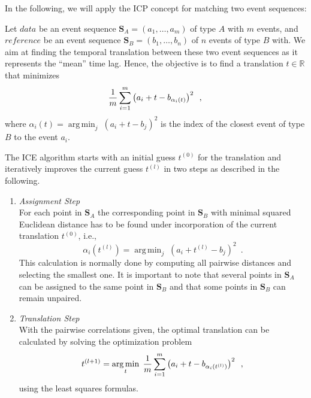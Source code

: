 \documentclass[conference]{IEEEtran}
\theoremstyle{examplestyle}
\DeclareMathOperator*{\argmin}{arg\,min}
\begin{document}
In the following, we will apply the \ac{ICP} concept for matching two event sequences:

Let \(data\) be an event sequence \(\pmb{S}_A = (a_1,\ldots, a_m)\) of type \(A\) with \(m\) events, and \(reference\) be an event sequence \(\pmb{S}_B=(b_1,\ldots, b_n)\) of \(n\) events of type \(B\) with. 
We aim at finding the temporal translation between these two event sequences as it represents the ``mean'' time lag.
Hence, the objective is to find a translation $t \in \mathbb{R}$ that minimizes 
\begin{equation}
 \dfrac{1}{m} \sum_{i = 1}^{m} \left( a_i + t - b_{\alpha_i(t)} \right)^2 \enspace , \\
\end{equation}
where $\alpha_i(t)= \argmin_j \; (a_i+t-b_j)^2$ is the index of the closest event of type $B$ to the event $a_i$.

The \ac{ICE} algorithm starts with an initial guess $t^{(0)}$ for the translation and iteratively improves the current guess $t^{(l)}$ in two steps as described in the following.

\begin{enumerate}
 \item \emph{Assignment Step}\\
For each point in \(\pmb{S}_A\) the corresponding point in \(\pmb{S}_B\) with minimal squared Euclidean distance has to be found under incorporation of the current translation $t^{(0)}$, i.e., 
\begin{equation}
\alpha_i(t^{(l)})= \argmin_j \; (a_i+t^{(l)}-b_j)^2 \enspace .
\end{equation}
This calculation is normally done by computing all pairwise distances and selecting the smallest one. It is important to note that several points in \(\pmb{S}_A\) can be assigned to the same point in \(\pmb{S}_B\) and that some points in \(\pmb{S}_B\) can remain unpaired.



\item \emph{Translation Step}\\
With the pairwise correlations given, the optimal translation can be calculated by solving the optimization problem
\begin{equation}
t^{(l+1)}= \argmin_{t} \; \dfrac{1}{m} \sum_{i = 1}^{m} \left( a_i + t - b_{\alpha_i(t^{(l)})} \right)^2 \enspace , \\
\end{equation}
using the least squares formulas.
 
\end{enumerate}
\end{document}
